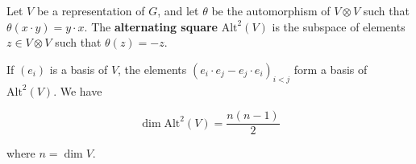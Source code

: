 Let $V$ be a representation of $G$, and let $\theta$ be the automorphism of $V \otimes V$ such that $\theta(x \cdot y) = y \cdot x$. The \textbf{alternating square} $\text{Alt}^2(V)$ is the subspace of elements $z \in V \otimes V$ such that $\theta(z) = -z$.

If $(e_i)$ is a basis of $V$, the elements $(e_i \cdot e_j - e_j \cdot e_i)_{i < j}$ form a basis of $\text{Alt}^2(V)$. We have

$$\dim \text{Alt}^2(V) = \frac{n(n-1)}{2}$$

where $n = \dim V$.
